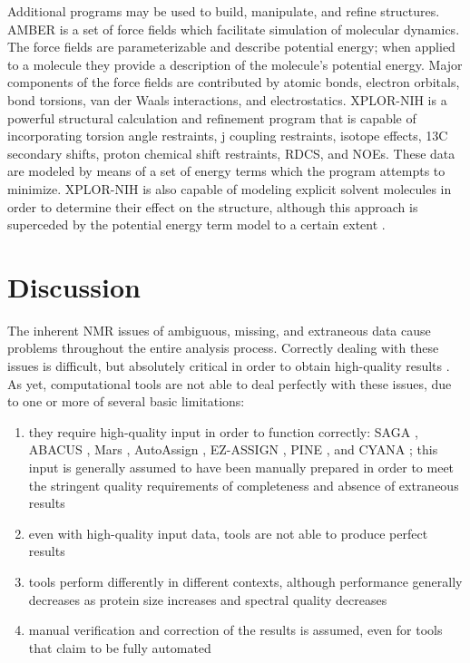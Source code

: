 Additional programs may be used to build, manipulate, and refine structures.
AMBER \cite{amber} is a set 
of force fields which facilitate simulation of molecular dynamics.  The
force fields are parameterizable and describe potential energy; when applied
to a molecule they provide a description of the molecule's potential energy. 
Major components of the force fields are contributed by atomic bonds, 
electron orbitals, bond torsions, van der Waals interactions, and electrostatics.
XPLOR-NIH \cite{xplor-nih} is a
powerful structural calculation and refinement program that is capable of
incorporating torsion angle restraints, j coupling restraints, isotope 
effects, 13C secondary shifts, proton chemical shift restraints, RDCS, and NOEs.
These data are modeled by means of a set of energy terms which the program
attempts to minimize.  XPLOR-NIH is also capable of modeling explicit 
solvent molecules in order to determine their effect on the structure, 
although this approach is superceded by the potential energy term model
to a certain extent \cite{xplor-nih}.



\section{Discussion}

The inherent NMR issues of ambiguous, missing, and extraneous data cause 
problems throughout the entire analysis process.  Correctly dealing with 
these issues is difficult, but absolutely critical in order to obtain 
high-quality results \cite{williamson2009automated, guntert2009automated, 
altieri2004automation, baran2004automated}.  As yet, computational tools 
are not able to deal perfectly with these issues, due to one or more of 
several basic limitations: 
\begin{enumerate}
  \item they require high-quality input in order to function correctly:
    SAGA \cite{saga}, ABACUS \cite{abacus_assignment}, Mars \cite{mars}, 
    AutoAssign \cite{autoassign2001}, EZ-ASSIGN \cite{ezassign},
    PINE \cite{pine}, and CYANA \cite{cyana2004};
  this input is generally assumed to have been manually prepared in order 
  to meet the stringent quality requirements of completeness and absence of 
  extraneous results
  \item even with high-quality input data, tools are not able to produce 
  perfect results 
  \item tools perform differently in different contexts, although 
  performance generally decreases as protein size increases and spectral quality 
  decreases
  \item manual verification and correction of the results is assumed, 
  even for tools that claim to be fully automated 
  \cite{williamson2009automated, guntert2009automated, altieri2004automation,
  baran2004automated}
\end{enumerate}

